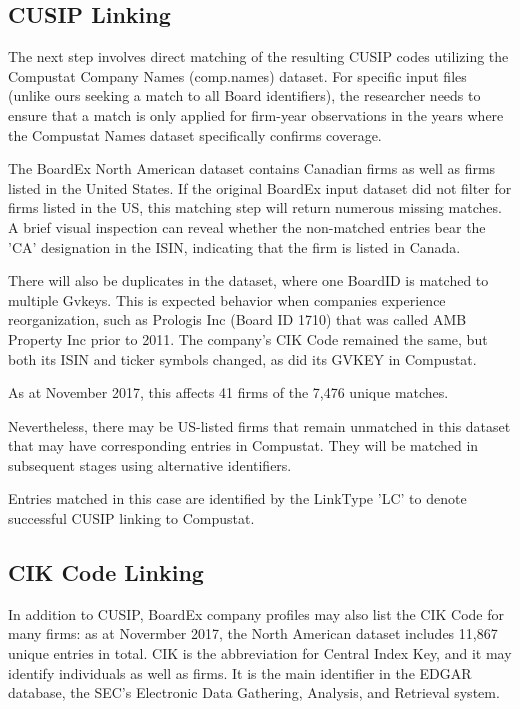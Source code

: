 \documentclass[12pt]{article}
\begin{document}
\subsection{CUSIP Linking}\label{sec:CUSIPmatch}

The next step involves direct matching of the resulting CUSIP codes utilizing the Compustat Company Names (comp.names) dataset.
For specific input files (unlike ours seeking a match to all Board identifiers), the researcher needs to ensure that a match is only applied for firm-year observations in the years where the Compustat Names dataset specifically confirms coverage.

The BoardEx North American dataset contains Canadian firms as well as firms listed in the United States.
If the original BoardEx input dataset did not filter for firms listed in the US, this matching step will return numerous missing matches.
A brief visual inspection can reveal whether the non-matched entries bear the 'CA' designation in the ISIN, indicating that the firm is listed in Canada.

There will also be duplicates in the dataset, where one BoardID is matched to multiple Gvkeys.
This is expected behavior when companies experience reorganization, such as Prologis Inc (Board ID 1710) that was called AMB Property Inc prior to 2011.
The company's CIK Code remained the same, but both its ISIN and ticker symbols changed, as did its GVKEY in Compustat.

\begin{center}

\end{center}

As at November 2017, this affects 41 firms of the 7,476 unique matches.

Nevertheless, there may be US-listed firms that remain unmatched in this dataset that may have corresponding entries in Compustat.
They will be matched in subsequent stages using alternative identifiers.

Entries matched in this case are identified by the LinkType 'LC' to denote successful CUSIP linking to Compustat.

\subsection{CIK Code Linking}\label{sec:CIKmatch}

In addition to CUSIP, BoardEx company profiles may also list the CIK Code for many firms: as at Novermber 2017, the North American dataset includes 11,867 unique entries in total.
CIK is the abbreviation for Central Index Key, and it may identify individuals as well as firms.
It is the main identifier in the EDGAR database, the SEC's Electronic Data Gathering, Analysis, and Retrieval system.
\end{document}
